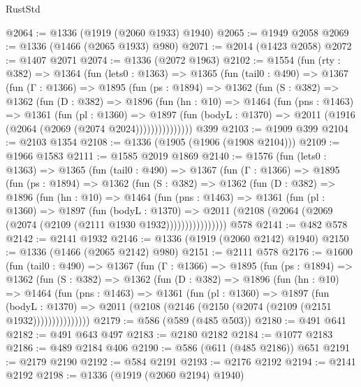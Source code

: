 \begin{lexlean}{RustStd}
\begin{coremodule}
@2064 := @1336 (@1919 (@2060 @1933) @1940)
@2065 := @1949 @2058
@2069 := @1336 (@1466 (@2065 @1933) @980)
@2071 := @2014 (@1423 @2058)
@2072 := @1407 @2071
@2074 := @1336 (@2072 @1963)
@2102 := @1554
    (fun (rty : @382) =>
    @1364
      (fun (lets0 : @1363) =>
      @1365
        (fun (tail0 : @490) =>
        @1367
          (fun (Γ : @1366) =>
          @1895
            (fun (ps : @1894) =>
            @1362
              (fun (S : @382) =>
              @1362
                (fun (D : @382) =>
                @1896
                  (fun (hn : @10) =>
                  @1464
                    (fun (pns : @1463) =>
                    @1361
                      (fun (pl : @1360) =>
                      @1897
                        (fun (bodyL : @1370) =>
                        @2011 (@1916 (@2064 (@2069 (@2074 @2024)))))))))))))))
    @399
@2103 := @1909 @399
@2104 := @2103 @1354
@2108 := @1336 (@1905 (@1906 (@1908 @2104)))
@2109 := @1966 @1583
@2111 := @1585 @2019 @1869
@2140 := @1576
    (fun (lets0 : @1363) =>
    @1365
      (fun (tail0 : @490) =>
      @1367
        (fun (Γ : @1366) =>
        @1895
          (fun (ps : @1894) =>
          @1362
            (fun (S : @382) =>
            @1362
              (fun (D : @382) =>
              @1896
                (fun (hn : @10) =>
                @1464
                  (fun (pns : @1463) =>
                  @1361
                    (fun (pl : @1360) =>
                    @1897
                      (fun (bodyL : @1370) =>
                      @2011 (@2108 (@2064 (@2069 (@2074 (@2109 (@2111 @1930 @1932))))))))))))))))
    @578
@2141 := @482 @578
@2142 := @2141 @1932
@2146 := @1336 (@1919 (@2060 @2142) @1940)
@2150 := @1336 (@1466 (@2065 @2142) @980)
@2151 := @2111 @578
@2176 := @1600
    (fun (tail0 : @490) =>
    @1367
      (fun (Γ : @1366) =>
      @1895
        (fun (ps : @1894) =>
        @1362
          (fun (S : @382) =>
          @1362
            (fun (D : @382) =>
            @1896
              (fun (hn : @10) =>
              @1464
                (fun (pns : @1463) =>
                @1361
                  (fun (pl : @1360) =>
                  @1897
                    (fun (bodyL : @1370) =>
                    @2011 (@2108 (@2146 (@2150 (@2074 (@2109 (@2151 @1932)))))))))))))))
@2179 := @586 (@589 (@485 @503))
@2180 := @491 @641
@2182 := @491 @643 @497
@2183 := @2180 @2182
@2184 := @1077 @2183
@2186 := @489 @2184 @406
@2190 := @586 (@611 (@485 @2186)) @651
@2191 := @2179 @2190
@2192 := @584 @2191
@2193 := @2176 @2192
@2194 := @2141 @2192
@2198 := @1336 (@1919 (@2060 @2194) @1940)

\end{coremodule}
\end{lexlean}
